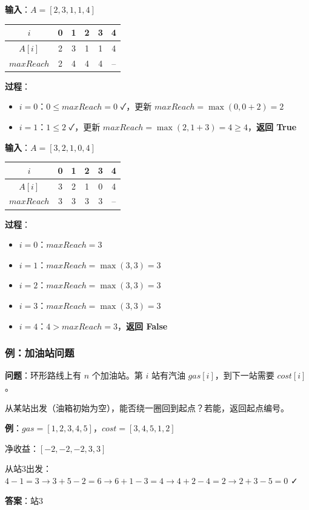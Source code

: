 \documentclass[12pt, a4paper]{ctexart}
\begin{document}
\begin{blackboard}[跳跃游戏手算]

\textbf{输入}：$A = [2, 3, 1, 1, 4]$

\begin{center}
\begin{tabular}{c|ccccc}
$i$ & 0 & 1 & 2 & 3 & 4 \\
\hline
$A[i]$ & 2 & 3 & 1 & 1 & 4 \\
$maxReach$ & 2 & 4 & 4 & 4 & -- \\
\end{tabular}
\end{center}

\textbf{过程}：
\begin{itemize}
    \item $i=0$：$0 \leq maxReach=0$ ✓，更新 $maxReach = \max(0, 0+2) = 2$
    \item $i=1$：$1 \leq 2$ ✓，更新 $maxReach = \max(2, 1+3) = 4 \geq 4$，\textbf{返回 True}
\end{itemize}

\textbf{输入}：$A = [3, 2, 1, 0, 4]$

\begin{center}
\begin{tabular}{c|ccccc}
$i$ & 0 & 1 & 2 & 3 & 4 \\
\hline
$A[i]$ & 3 & 2 & 1 & 0 & 4 \\
$maxReach$ & 3 & 3 & 3 & 3 & -- \\
\end{tabular}
\end{center}

\textbf{过程}：
\begin{itemize}
    \item $i=0$：$maxReach = 3$
    \item $i=1$：$maxReach = \max(3, 3) = 3$
    \item $i=2$：$maxReach = \max(3, 3) = 3$
    \item $i=3$：$maxReach = \max(3, 3) = 3$
    \item $i=4$：$4 > maxReach = 3$，\textbf{返回 False}
\end{itemize}

\end{blackboard}

\subsubsection{例：加油站问题}

\begin{blackboard}

\textbf{问题}：环形路线上有 $n$ 个加油站。第 $i$ 站有汽油 $gas[i]$，到下一站需要 $cost[i]$。

从某站出发（油箱初始为空），能否绕一圈回到起点？若能，返回起点编号。

\textbf{例}：$gas = [1, 2, 3, 4, 5]$，$cost = [3, 4, 5, 1, 2]$

净收益：$[-2, -2, -2, 3, 3]$

从站3出发：$4-1=3 \to 3+5-2=6 \to 6+1-3=4 \to 4+2-4=2 \to 2+3-5=0$ ✓

\textbf{答案}：站3

\end{blackboard}
\end{document}
